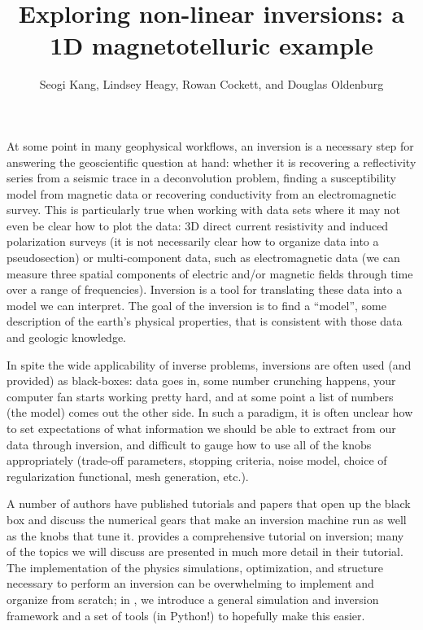 \documentclass[11pt,oneside]{article}
\begin{document}
\title{Exploring non-linear inversions: a 1D magnetotelluric example}
\author{Seogi Kang, Lindsey Heagy, Rowan Cockett, and Douglas Oldenburg}

\maketitle

At some point in many geophysical workflows, an inversion is a necessary step for answering the geoscientific question at hand: whether it is recovering a reflectivity series from a seismic trace in a deconvolution problem, finding a susceptibility model from magnetic data or recovering conductivity from an electromagnetic survey. This is particularly true when working with data sets where it may not even be clear how to plot the data: 3D direct current resistivity and induced polarization surveys (it is not necessarily clear how to organize data into a pseudosection) or multi-component data, such as electromagnetic data (we can measure three spatial components of electric and/or magnetic fields through time over a range of frequencies). Inversion is a tool for translating these data into a model we can interpret. The goal of the inversion is to find a ``model'', some description of the earth’s physical properties, that is consistent with those data and geologic knowledge.

In spite the wide applicability of inverse problems, inversions are often used (and provided) as black-boxes: data goes in, some number crunching happens, your computer fan starts working pretty hard, and at some point a list of numbers (the model) comes out the other side. In such a paradigm, it is often unclear how to set expectations of what information we should be able to extract from our data through inversion, and difficult to gauge how to use all of the knobs appropriately (trade-off parameters, stopping criteria, noise model, choice of regularization functional, mesh generation, etc.).

A number of authors have published tutorials and papers that open up the black box and discuss the numerical gears that make an inversion machine run as well as the knobs that tune it. \cite{OldenburgTutorial} provides a comprehensive tutorial on inversion; many of the topics we will discuss are presented in much more detail in their tutorial. The implementation of the physics simulations, optimization, and structure necessary to perform an inversion can be overwhelming to implement and organize from scratch; in \citep{SimPEGPaper}, we introduce a general simulation and inversion framework and a set of tools (in Python!) to hopefully make this easier.
\end{document}
